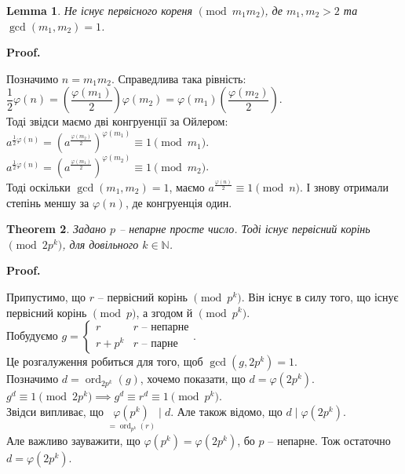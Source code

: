 \documentclass[a4paper, 14pt]{extarticle}
\makeatletter
\theoremstyle{theoremdd}
\newtheorem{theorem}{Theorem}[subsection]
\theoremstyle{theoremdd}
\theoremstyle{theoremdd}
\theoremstyle{theoremdd}
\theoremstyle{theoremdd}
\theoremstyle{theoremdd}
\theoremstyle{theoremdd}
\newtheorem{lemma}[theorem]{Lemma}
\theoremstyle{theoremdd}
\def\qed{$\blacksquare$}
\renewenvironment{proof}[1][Proof.\\]{\par
\pushQED{\hfill \qed}%
\normalfont \topsep6\p@\@plus6\p@\relax
\trivlist
\item\relax
{\bfseries
#1\@addpunct{.}}\hspace\labelsep\ignorespaces
}{%
\popQED\endtrivlist\@endpefalse
}
\DeclareMathOperator{\ord}{ord}
\makeatother
\begin{document}
\begin{lemma}
Не існує первісного кореня $\!\! \pmod {m_1m_2}$, де $m_1,m_2 > 2$ та $\gcd(m_1,m_2) = 1$.
\end{lemma}

\begin{proof}
Позначимо $n = m_1m_2$. Справедлива така рівність:\\
$\dfrac{1}{2} \varphi(n) = \left(\dfrac{\varphi(m_1)}{2} \right) \varphi(m_2) = \varphi(m_1) \left( \dfrac{\varphi(m_2)}{2} \right)$.\\
Тоді звідси маємо дві конгруенції за Ойлером:\\
$a^{\frac{1}{2} \varphi(n)} = \left(a^{\frac{\varphi(m_2)}{2}} \right)^{\varphi(m_1)} \equiv 1 \pmod {m_1}$.\\
$a^{\frac{1}{2} \varphi(n)} = \left(a^{\frac{\varphi(m_1)}{2}} \right)^{\varphi(m_2)} \equiv 1 \pmod {m_2}$.\\
Тоді оскільки $\gcd(m_1,m_2) = 1$, маємо $a^{\frac{\varphi(n)}{2}} \equiv 1 \pmod {n}$. І знову отримали степінь меншу за $\varphi(n)$, де конгруенція один.
\end{proof}

\begin{theorem}
Задано $p$ -- непарне просте число. Тоді існує первісний корінь $\!\! \pmod {2p^k}$, для довільного $k \in \mathbb{N}$.
\end{theorem}

\begin{proof}
Припустимо, що $r$ -- первісний корінь $\pmod {p^k}$. Він існує в силу того, що існує первісний корінь $\pmod p$, а згодом й $\pmod {p^k}$.\\
Побудуємо $g = \begin{cases} r & r \text{ -- непарне} \\ r+p^k & r \text{ -- парне} \end{cases}$. \\
Це розгалуження робиться для того, щоб $\gcd(g,2p^k) = 1$.\\
Позначимо $d = \ord_{2p^k}(g)$, хочемо показати, що $d = \varphi(2p^k)$.\\
$g^d \equiv 1 \pmod {2p^k} \implies g^d \equiv r^d \equiv 1 \pmod {p^k}$.\\
Звідси випливає, що $\underset{=\ord_{p^k}(r)}{\varphi(p^k)} \mid d$. Але також відомо, що $d \mid \varphi(2p^k)$.\\
Але важливо зауважити, що $\varphi(p^k) = \varphi(2p^k)$, бо $p$ -- непарне. Тож остаточно $d = \varphi(2p^k)$.
\end{proof}
\end{document}
